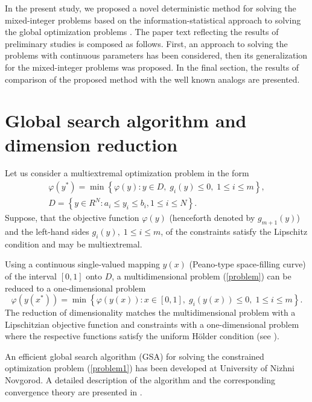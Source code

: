\documentclass{llncs}
\begin{document}
In the present study, we proposed a novel deterministic method for solving the mixed-integer 
problems based on the information-statistical approach to solving the global optimization 
problems \cite{Strongin2000,Strongin2013}. The paper text reflecting the results of preliminary 
studies is composed as follows. First, an approach to solving the problems with continuous 
parameters has been considered, then its generalization for the mixed-integer problems was 
proposed. In the final section, the results of comparison of the proposed method with the well 
known analogs are presented.

\section{Global search algorithm and dimension reduction}

Let us consider a multiextremal optimization problem in the form
\begin{gather}\label{problem}
\varphi(y^\ast)=\min{\left\{\varphi(y):y\in D, \; g_i(y)\leq 0, \; 1 \leq i \leq m\right\}},\\
D=\left\{y\in R^N: a_i\leq y_i \leq b_i, 1\leq i \leq N\right\}.\nonumber
\end{gather}
Suppose, that the objective function $\varphi(y)$ (henceforth denoted by $g_{m+1}(y)$) and
the left-hand sides $g_i(y), \; 1\leq i \leq m$, of the constraints satisfy the Lipschitz condition
and may be multiextremal.

Using a continuous single-valued mapping $y(x)$  (Peano-type space-filling curve) of the interval $[0,1]$ onto $D$, a multidimensional problem (\ref{problem}) can be reduced to a one-dimensional problem
\begin{equation}\label{problem1}
\varphi(y(x^\ast))=\min \left\{\varphi(y(x)): x \in [0,1], \; g_i(y(x))\leq 0, \; 1 \leq i \leq m\right\}.
\end{equation}
The reduction of dimensionality matches the multidimensional problem with a Lipschitzian objective function and constraints with a one-dimensional problem where the respective functions satisfy the uniform H\"older condition (see \cite{Strongin2000}).

An efficient global search algorithm (GSA) for solving the constrained optimization problem 
(\ref{problem1}) has been developed at University of Nizhni Novgorod. A detailed description 
of the algorithm and the corresponding convergence theory are presented in 
\cite{Strongin2000}.
\end{document}
